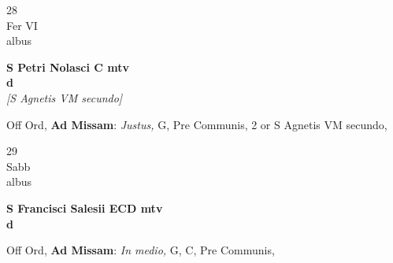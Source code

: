 \documentclass[10pt, openany]{book}
\begin{document}
        \begin{center}
            \begin{minipage}{3.5in}
                \vspace{2em}
                \begin{minipage}{0.5in}
                    {\Huge 28} \\
                    {\normalsize Fer VI} \\
                    {\normalsize albus}
                \end{minipage}
                \begin{minipage}{3.0in}
                    \textbf{ \large S Petri Nolasci C mtv \\
                    \textnormal{\normalsize d}} \\ \textit{[S Agnetis VM secundo]} \\ 
                \end{minipage}
                \begin{justify}Off Ord, \textbf{Ad Missam}: \textit{Justus,} G, Pre Communis, 2 or S Agnetis VM secundo,  
                \end{justify}
            \end{minipage}
        \end{center}
    
        \begin{center}
            \begin{minipage}{3.5in}
                \vspace{2em}
                \begin{minipage}{0.5in}
                    {\Huge 29} \\
                    {\normalsize Sabb} \\
                    {\normalsize albus}
                \end{minipage}
                \begin{minipage}{3.0in}
                    \textbf{ \large S Francisci Salesii ECD mtv \\
                    \textnormal{\normalsize d}} \\ 
                \end{minipage}
                \begin{justify}Off Ord, \textbf{Ad Missam}: \textit{In medio,} G, C, Pre Communis,  
                \end{justify}
            \end{minipage}
        \end{center}
    
\end{document}

